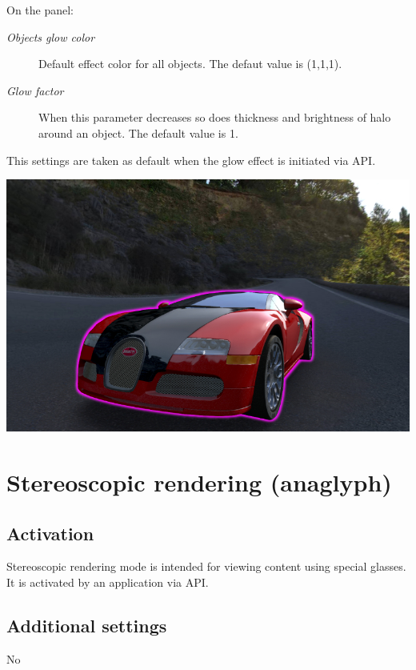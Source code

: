 \documentclass[a4paper,12pt,oneside]{sphinxmanual}
\begin{document}
On the  panel:
\begin{description}
\item[{\emph{Objects glow color}}] \leavevmode
Default effect color for all objects. The defaut value is (1,1,1).

\item[{\emph{Glow factor}}] \leavevmode
When this parameter decreases so does thickness and brightness of halo around an object. The default value is 1.

\end{description}

This settings are taken as default when the glow effect is initiated via API.

{\hfill\includegraphics[width=1.000\linewidth]{glow.jpg}\hfill}


\section{Stereoscopic rendering (anaglyph)}
\label{postprocessing_effects:anaglyph}\label{postprocessing_effects:index-5}\label{postprocessing_effects:id20}

\subsection{Activation}
\label{postprocessing_effects:id21}
Stereoscopic rendering mode is intended for viewing content using special glasses. It is activated by an application via API.


\subsection{Additional settings}
\label{postprocessing_effects:id22}
No
\end{document}
